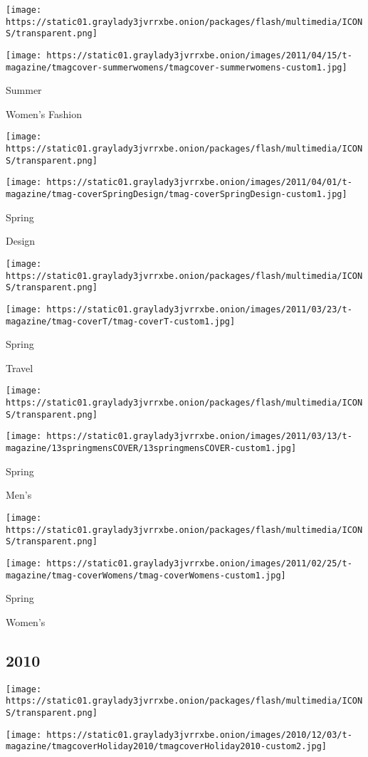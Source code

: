 \texttt{[image: https://static01.graylady3jvrrxbe.onion/packages/flash/multimedia/ICONS/transparent.png]}

\texttt{[image: https://static01.graylady3jvrrxbe.onion/images/2011/04/15/t-magazine/tmagcover-summerwomens/tmagcover-summerwomens-custom1.jpg]}

Summer

Women's Fashion

\texttt{[image: https://static01.graylady3jvrrxbe.onion/packages/flash/multimedia/ICONS/transparent.png]}

\texttt{[image: https://static01.graylady3jvrrxbe.onion/images/2011/04/01/t-magazine/tmag-coverSpringDesign/tmag-coverSpringDesign-custom1.jpg]}

Spring

Design

\texttt{[image: https://static01.graylady3jvrrxbe.onion/packages/flash/multimedia/ICONS/transparent.png]}

\texttt{[image: https://static01.graylady3jvrrxbe.onion/images/2011/03/23/t-magazine/tmag-coverT/tmag-coverT-custom1.jpg]}

Spring

Travel

\texttt{[image: https://static01.graylady3jvrrxbe.onion/packages/flash/multimedia/ICONS/transparent.png]}

\texttt{[image: https://static01.graylady3jvrrxbe.onion/images/2011/03/13/t-magazine/13springmensCOVER/13springmensCOVER-custom1.jpg]}

Spring

Men's

\texttt{[image: https://static01.graylady3jvrrxbe.onion/packages/flash/multimedia/ICONS/transparent.png]}

\texttt{[image: https://static01.graylady3jvrrxbe.onion/images/2011/02/25/t-magazine/tmag-coverWomens/tmag-coverWomens-custom1.jpg]}

Spring

Women's

\hypertarget{2010}{%
\subsection{2010}\label{2010}}

\texttt{[image: https://static01.graylady3jvrrxbe.onion/packages/flash/multimedia/ICONS/transparent.png]}

\texttt{[image: https://static01.graylady3jvrrxbe.onion/images/2010/12/03/t-magazine/tmagcoverHoliday2010/tmagcoverHoliday2010-custom2.jpg]}

